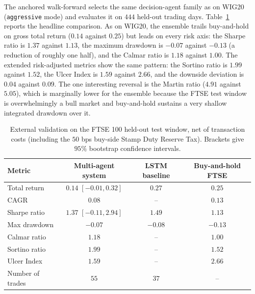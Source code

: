 \documentclass{ieeeaccess}
\newcommand{\FtseOOSDays}{\ensuremath{444}}
\newcommand{\FtseTRtest}{\ensuremath{0.14}}
\newcommand{\FtseCAGR}{\ensuremath{0.08}}
\newcommand{\FtseMDD}{\ensuremath{-0.07}}
\newcommand{\FtseSharpe}{\ensuremath{1.37}}
\newcommand{\FtseCalmar}{\ensuremath{1.18}}
\newcommand{\FtseNtrades}{\ensuremath{55}}
\newcommand{\FtseTRtestCIlow}{\ensuremath{-0.01}}
\newcommand{\FtseTRtestCIhigh}{\ensuremath{0.32}}
\newcommand{\FtseSharpeCIlow}{\ensuremath{-0.11}}
\newcommand{\FtseSharpeCIhigh}{\ensuremath{2.94}}
\newcommand{\FtseBHtest}{\ensuremath{0.25}}
\newcommand{\FtseBHcagr}{\ensuremath{0.13}}
\newcommand{\FtseBHmdd}{\ensuremath{-0.13}}
\newcommand{\FtseBHsharpe}{\ensuremath{1.13}}
\newcommand{\FtseBHcalmar}{\ensuremath{1.00}}
\newcommand{\FtseEnsSortino}{\ensuremath{1.99}}
\newcommand{\FtseBHSortino}{\ensuremath{1.52}}
\newcommand{\FtseEnsDownDev}{\ensuremath{0.04}}
\newcommand{\FtseBHDownDev}{\ensuremath{0.09}}
\newcommand{\FtseEnsUlcer}{\ensuremath{1.59}}
\newcommand{\FtseBHUlcer}{\ensuremath{2.66}}
\newcommand{\FtseEnsMartin}{\ensuremath{4.91}}
\newcommand{\FtseBHMartin}{\ensuremath{5.05}}
\newcommand{\FtseLSTMtest}{\ensuremath{0.27}}
\newcommand{\FtseLSTMsharpe}{\ensuremath{1.49}}
\newcommand{\FtseLSTMmdd}{\ensuremath{-0.08}}
\newcommand{\FtseLSTMtrades}{\ensuremath{37}}
\begin{document}
The anchored walk-forward selects the same decision-agent family as on WIG20 (\texttt{aggressive} mode) and evaluates it on \FtseOOSDays{} held-out trading days. Table~\ref{tab:ftse} reports the headline comparison. As on WIG20, the ensemble trails buy-and-hold on gross total return (\FtseTRtest{} against \FtseBHtest{}) but leads on every risk axis: the Sharpe ratio is \FtseSharpe{} against \FtseBHsharpe{}, the maximum drawdown is \FtseMDD{} against \FtseBHmdd{} (a reduction of roughly one half), and the Calmar ratio is \FtseCalmar{} against \FtseBHcalmar{}. The extended risk-adjusted metrics show the same pattern: the Sortino ratio is \FtseEnsSortino{} against \FtseBHSortino{}, the Ulcer Index is \FtseEnsUlcer{} against \FtseBHUlcer{}, and the downside deviation is \FtseEnsDownDev{} against \FtseBHDownDev{}. The one interesting reversal is the Martin ratio (\FtseEnsMartin{} against \FtseBHMartin{}), which is marginally lower for the ensemble because the FTSE test window is overwhelmingly a bull market and buy-and-hold sustains a very shallow integrated drawdown over it.

\begin{table}[t]
\centering
\caption{External validation on the FTSE 100 held-out test window, net of transaction costs (including the $50$ bps buy-side Stamp Duty Reserve Tax). Brackets give $95\%$ bootstrap confidence intervals.}
\label{tab:ftse}
\begin{tabular}{lccc}
\toprule
Metric & Multi-agent system & LSTM baseline & Buy-and-hold FTSE \\
\midrule
Total return     & $\FtseTRtest$ $[\FtseTRtestCIlow, \FtseTRtestCIhigh]$ & $\FtseLSTMtest$   & $\FtseBHtest$ \\
CAGR             & $\FtseCAGR$    & --              & $\FtseBHcagr$ \\
Sharpe ratio     & $\FtseSharpe$ $[\FtseSharpeCIlow, \FtseSharpeCIhigh]$ & $\FtseLSTMsharpe$ & $\FtseBHsharpe$ \\
Max drawdown     & $\FtseMDD$     & $\FtseLSTMmdd$  & $\FtseBHmdd$ \\
Calmar ratio     & $\FtseCalmar$  & --              & $\FtseBHcalmar$ \\
Sortino ratio    & $\FtseEnsSortino$ & --           & $\FtseBHSortino$ \\
Ulcer Index      & $\FtseEnsUlcer$   & --           & $\FtseBHUlcer$ \\
Number of trades & $\FtseNtrades$ & $\FtseLSTMtrades$ & -- \\
\bottomrule
\end{tabular}
\end{table}
\end{document}
